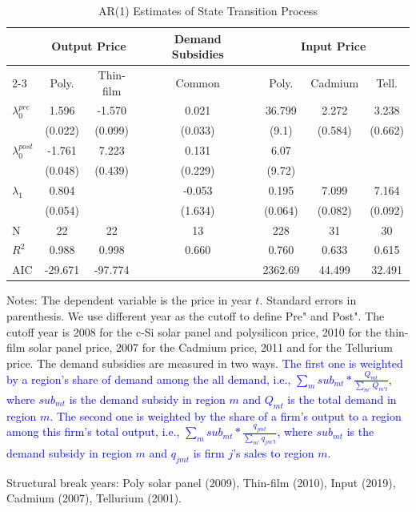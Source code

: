 \documentclass[12pt, letter]{article}
\begin{document}
\begin{table}[tbh]
\centering
\caption{AR(1) Estimates of State Transition Process}
\label{tab:est_state_transition}
\begin{threeparttable}
\begin{tabularx}{1.00\textwidth}{Xcccccccc}
\toprule
& \multicolumn{2}{c}{Output Price} && \multicolumn{1}{c}{Demand Subsidies} && \multicolumn{3}{c}{Input Price} \\
\cmidrule{2-3} \cmidrule{5-5} \cmidrule{7-9}
 & Poly. & Thin-film && Common && Poly. & Cadmium & Tell. \\
\midrule
$\lambda_0^{pre}$ 
    & 1.596 & -1.570 && 0.021 && 36.799 & 2.272 & 3.238 \\
    & (0.022) & (0.099) && (0.033) && (9.1) & (0.584) & (0.662) \\

$\lambda_0^{post}$ 
    & -1.761 & 7.223 && 0.131 && 6.07 &  &  \\
    & (0.048) & (0.439) && (0.229) && (9.72) &  &  \\

$\lambda_1$  
    & 0.804 &  && -0.053 &&  0.195 & 7.099 & 7.164 \\
    & (0.054) &  && (1.634) && (0.064) & (0.082) & (0.092) \\

\midrule
N 
    & 22 & 22 && 13 && 228 & 31 & 30 \\
$R^2$ 
    & 0.988 & 0.998 && 0.660 && 0.760 & 0.633 & 0.615 \\
AIC 
    & -29.671 & -97.774 &&  &  & 2362.69 & 44.499 & 32.491 \\
\bottomrule
\end{tabularx}
\begin{tablenotes}
    \item Notes: The dependent variable is the price in year $t$. Standard errors in parenthesis. We use different year as the cutoff to define Pre" and Post". The cutoff year is 2008 for the c-Si solar panel and polysilicon price, 2010 for the thin-film solar panel price, 2007 for the Cadmium price, 2011 and for the Tellurium price. The demand subsidies are measured in two ways. \textcolor{blue}{The first one is weighted by a region's share of demand among the all demand, i.e., $\sum_m sub_{mt} * \frac{Q_{mt}}{\sum_{m'}Q_{m't}}$, where $sub_{mt}$ is the demand subsidy in region $m$ and $Q_{mt}$ is the total demand in region $m$. The second one is weighted by the share of a firm's output to a region among this firm's total output, i.e., $\sum_m sub_{mt} * \frac{q_{jmt}}{\sum_{m'}q_{jm't}}$, where $sub_{mt}$ is the demand subsidy in region $m$ and $q_{jmt}$ is firm $j$'s sales to region $m$.} 
    \item Structural break years: Poly solar panel (2009), Thin-film (2010), Input (2019), Cadmium (2007), Tellurium (2001).
\end{tablenotes}
\end{threeparttable}
\end{table}
\end{document}
